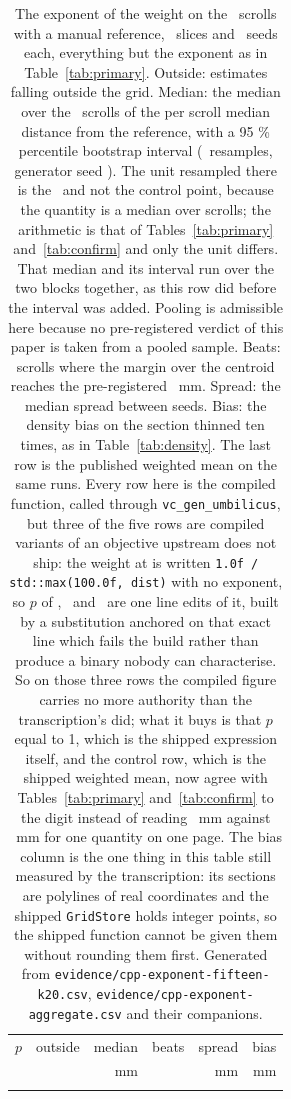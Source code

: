 \begin{table}[t]
\caption{The exponent of the weight on the \RevExpScrolls\ scrolls with a manual reference,
\RevFifteenSlices\ slices and \RevKSeeds\ seeds each, everything but the exponent as in
Table~\ref{tab:primary}. Outside: estimates falling outside the grid. Median: the median over the
\RevExpScrolls\ scrolls of the per scroll median distance from the reference, with a 95 \%
percentile bootstrap interval (\RevKResamples\ resamples, generator seed \RevKBootSeed). The unit
resampled there is the \RevExpCiUnit\ and not the control point, because the quantity is a median
over scrolls; the arithmetic is that of Tables~\ref{tab:primary} and~\ref{tab:confirm} and only
the unit differs. That median and its interval run over the two blocks
together, as this row did before the interval was added. Pooling is admissible here because no
pre-registered verdict of this paper is taken from a pooled sample. Beats: scrolls where
the margin over the centroid reaches the pre-registered \UmbThresholdMm~mm. Spread: the median
spread between seeds. Bias: the density bias on the section thinned ten times, as in
Table~\ref{tab:density}. The last row is the published weighted mean on the same runs. Every row here is the compiled
function, called through \texttt{vc\_gen\_umbilicus}, but three of the five rows are compiled
variants of an objective upstream does not ship: the weight at  is written
\texttt{1.0f / std::max(100.0f, dist)} with no exponent, so $p$ of \RevExpHalf, \RevExpOneHalf\
and \RevExpTwo\ are one line edits of it, built by a substitution anchored on that exact line
which fails the build rather than produce a binary nobody can characterise. So on those three
rows the compiled figure carries no more authority than the transcription's did; what it buys is
that $p$ equal to 1, which is the shipped expression itself, and the control row, which is the
shipped weighted mean, now agree with Tables~\ref{tab:primary} and~\ref{tab:confirm} to the
digit instead of reading \RevExpMeanMedianTranscription~mm against
\RevExpMeanMedian~mm for one quantity on one page. The bias column is the one thing in this table
still measured by the transcription: its sections are polylines of real coordinates and the
shipped \texttt{GridStore} holds integer points, so the shipped function cannot be given them
without rounding them first. Generated from \texttt{evidence/cpp-exponent-fifteen-k20.csv},
\texttt{evidence/cpp-exponent-aggregate.csv} and their companions.}
\label{tab:exponent}
\centering
\footnotesize
\setlength{\tabcolsep}{4pt}
\begin{tabular}{@{}lrrrrr@{}}
\toprule
$p$ & outside & median & beats & spread & bias \\
 & & mm & & mm & mm \\
\midrule
{}{rev1-exponent}
\bottomrule
\end{tabular}
\end{table}

